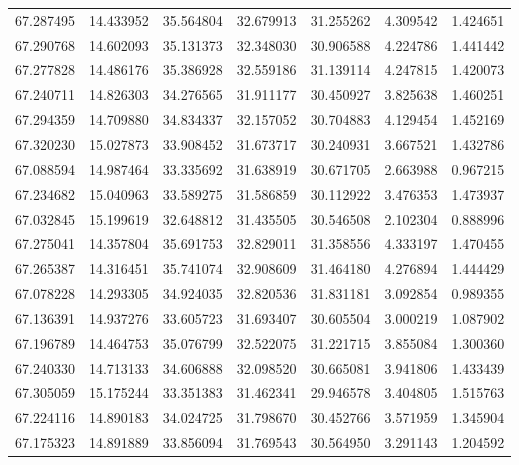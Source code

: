 \begin{tabular}{rrrrrrr}
 67.287495 &  14.433952 &         35.564804 &         32.679913 &         31.255262 &  4.309542 &  1.424651 \\
 67.290768 &  14.602093 &         35.131373 &         32.348030 &         30.906588 &  4.224786 &  1.441442 \\
 67.277828 &  14.486176 &         35.386928 &         32.559186 &         31.139114 &  4.247815 &  1.420073 \\
 67.240711 &  14.826303 &         34.276565 &         31.911177 &         30.450927 &  3.825638 &  1.460251 \\
 67.294359 &  14.709880 &         34.834337 &         32.157052 &         30.704883 &  4.129454 &  1.452169 \\
 67.320230 &  15.027873 &         33.908452 &         31.673717 &         30.240931 &  3.667521 &  1.432786 \\
 67.088594 &  14.987464 &         33.335692 &         31.638919 &         30.671705 &  2.663988 &  0.967215 \\
 67.234682 &  15.040963 &         33.589275 &         31.586859 &         30.112922 &  3.476353 &  1.473937 \\
 67.032845 &  15.199619 &         32.648812 &         31.435505 &         30.546508 &  2.102304 &  0.888996 \\
 67.275041 &  14.357804 &         35.691753 &         32.829011 &         31.358556 &  4.333197 &  1.470455 \\
 67.265387 &  14.316451 &         35.741074 &         32.908609 &         31.464180 &  4.276894 &  1.444429 \\
 67.078228 &  14.293305 &         34.924035 &         32.820536 &         31.831181 &  3.092854 &  0.989355 \\
 67.136391 &  14.937276 &         33.605723 &         31.693407 &         30.605504 &  3.000219 &  1.087902 \\
 67.196789 &  14.464753 &         35.076799 &         32.522075 &         31.221715 &  3.855084 &  1.300360 \\
 67.240330 &  14.713133 &         34.606888 &         32.098520 &         30.665081 &  3.941806 &  1.433439 \\
 67.305059 &  15.175244 &         33.351383 &         31.462341 &         29.946578 &  3.404805 &  1.515763 \\
 67.224116 &  14.890183 &         34.024725 &         31.798670 &         30.452766 &  3.571959 &  1.345904 \\
 67.175323 &  14.891889 &         33.856094 &         31.769543 &         30.564950 &  3.291143 &  1.204592 \\

\end{tabular}
